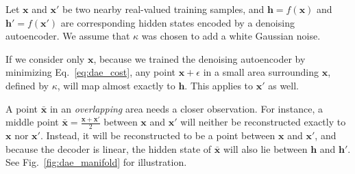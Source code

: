 \documentclass[dissertation,nocontribution]{aaltoseries}
\newcommand{\vect}[1]{\mathbf{#1}}
\newcommand{\vh}[0]{\vect{h}}
\newcommand{\vx}[0]{\vect{x}}
\begin{document}
Let $\vx$ and $\vx'$ be two nearby real-valued training
samples, and $\vh=f(\vx)$ and $\vh'=f(\vx')$ are
corresponding hidden states encoded by a denoising
autoencoder. We assume that $\kappa$ was chosen to add a
white Gaussian noise.

If we consider only $\vx$, because we trained the denoising
autoencoder by minimizing Eq.~\eqref{eq:dae_cost}, any point
$\vx + \epsilon$ in a small area surrounding $\vx$, defined
by $\kappa$, will map almost exactly to $\vh$. This applies
to $\vx'$ as well. 

A point $\bar{\vx}$ in an \textit{overlapping} area needs a
closer observation.
For instance, a middle point
$\bar{\vx} = \frac{\vx + \vx'}{2}$ between $\vx$ and $\vx'$
will neither be reconstructed exactly to $\vx$ nor $\vx'$.
Instead, it will be reconstructed to be a point between
$\vx$ and $\vx'$, and because the decoder is linear, the
hidden state of $\bar{\vx}$ will also lie between $\vh$ and
$\vh'$. See Fig.~\ref{fig:dae_manifold} for illustration.
\end{document}
